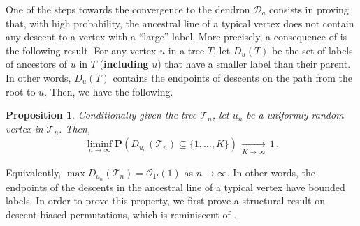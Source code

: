 \documentclass{article}
\newtheorem{proposition}[theorem]{Proposition}
\theoremstyle{remark}
\newcommand{\cO}{\mathcal{O}}
\newcommand{\cv}[1]{\,\underset{#1}{\longrightarrow}\,}
\newcommand{\cT}{\mathcal{T}}
\newcommand{\cD}{\mathcal{D}}
\newcommand{\bP}{\mathbf{P}}
\newcommand{\prob}[1]{\mathbf{P}{\left(#1\right)}}
\begin{document}
One of the steps towards the convergence to the dendron $\cD_a$ consists in proving that, with high probability, the ancestral line of a typical vertex does not contain any descent to a vertex with a ``large'' label. 
More precisely, a consequence of  is the following result. 
For any vertex $u$ in a tree $T$, let $D_u(T)$ be the set of labels of ancestors of $u$ in $T$ (\textbf{including} $u$) that have a smaller label than their parent.
In other words, $D_u(T)$ contains the endpoints of descents on the path from the root to $u$.
Then, we have the following.

\begin{proposition}
\label{prop:not many descents on the ancestral line}
    Conditionally given the tree $\cT_n$, let $u_n$ be a uniformly random vertex in $\cT_n$. 
    Then,
    \begin{align*}
      \liminf_{n\to\infty} \prob{ D_{u_n}(\cT_n) \subseteq \{1, \ldots, K\} } \cv{K\to\infty} 1 \,.
    \end{align*}
\end{proposition}

Equivalently, $\max D_{u_n}(\cT_n) = \cO_\bP(1)$ as $n\to\infty$. 
In other words, the endpoints of the descents in the ancestral line of a typical vertex have bounded labels. 
In order to prove this property, we first prove a structural result on descent-biased permutations, which is reminiscent of \cite[Lemma 15]{Thevenin_Wagner_2023}.
\end{document}
